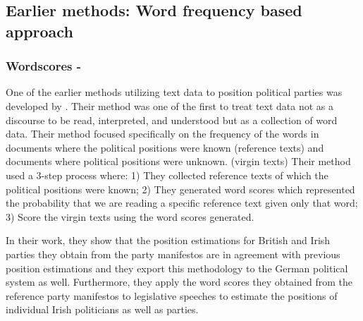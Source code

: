 \documentclass[final,5p,times,twocolumn,authoryear]{elsarticle}
\begin{document}

\subsection{Earlier methods: Word frequency based approach}
\subsubsection{Wordscores - \citealt{LAVER_BENOIT_GARRY_2003}}
One of the earlier methods utilizing text data to position political parties was developed by \citeauthor{LAVER_BENOIT_GARRY_2003}. Their method was one of the first to treat text data not as a discourse to be read, interpreted, and understood but as a collection of word data. Their method focused specifically on the frequency of the words in documents where the political positions were known (reference texts) and documents where political positions were unknown. (virgin texts) Their method used a 3-step process where: 1) They collected reference texts of which the political positions were known; 2) They generated word scores which represented the probability that we are reading a specific reference text given only that word; 3) Score the virgin texts using the word scores generated.

In their work, they show that the position estimations for British and Irish parties they obtain from the party manifestos are in agreement with previous position estimations and they export this methodology to the German political system as well. Furthermore, they apply the word scores they obtained from the reference party manifestos to legislative speeches to estimate the positions of individual Irish politicians as well as parties. 
\end{document}
